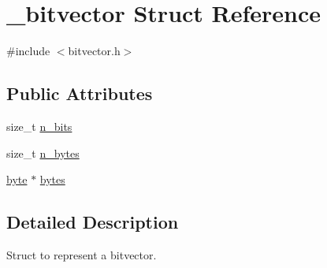 \hypertarget{struct__bitvector}{\section{\+\_\+bitvector Struct Reference}
\label{struct__bitvector}
}


{\ttfamily \#include $<$bitvector.\+h$>$}

\subsection*{Public Attributes}
\begin{DoxyCompactItemize}
\item 
size\+\_\+t \hyperlink{struct__bitvector_a88d4b6ede6ccc52c995f7a84b7f9723e}{n\+\_\+bits}
\item 
size\+\_\+t \hyperlink{struct__bitvector_a78dc0f5c85c269b46d9e4c7d7a39fa87}{n\+\_\+bytes}
\item 
\hyperlink{bitvector_8h_a82b52bf2b45e214a8f2100ebfdf1aee4}{byte} $\ast$ \hyperlink{struct__bitvector_a39ce08a096ed5e9e78605767e980c575}{bytes}
\end{DoxyCompactItemize}


\subsection{Detailed Description}
Struct to represent a bitvector. 

